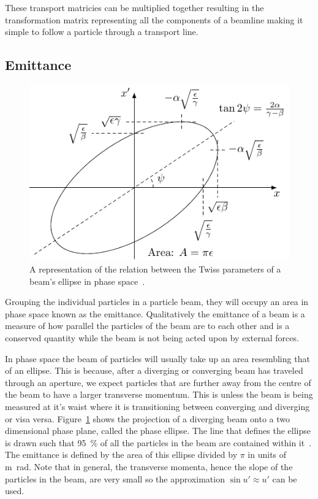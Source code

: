 These transport matricies can be multiplied together resulting in the
transformation matrix representing all the components of a beamline making it
simple to follow a particle through a transport line.

\subsection{Emittance}
\label{sec:emittance}

\begin{figure}
	\centering
	\includegraphics{figures/ellipse}
	\caption{
		A representation of the relation between the Twiss parameters of
		a beam's ellipse in phase space~\cite{wiedemann2007particle}.}
	\label{fig:ellipse}
\end{figure}

Grouping the individual particles in a particle beam, they will occupy an area
in phase space known as the emittance.  Qualitatively the emittance of a beam is
a measure of how parallel the particles of the beam are to each other and is a
conserved quantity while the beam is not being acted upon by external forces.

In phase space the beam of particles will usually take up an area resembling
that of an ellipse. This is because, after a diverging or converging beam has
traveled through an aperture, we expect particles that are further away from the
centre of the beam to have a larger transverse momentum. This is unless the beam
is being measured at it's waist where it is transitioning between converging and
diverging or visa versa. Figure~\ref{fig:ellipse} shows the projection of a
diverging beam onto a two dimensional phase plane, called the phase ellipse.
The line that defines the ellipse is drawn such that \SI{95}{\percent} of all
the particles in the beam are contained within it~\cite{buon1994beam}. The
emittance is defined by the area of this ellipse divided by \(\pi\) in units of
\si{\meter\radian}. Note that in general, the transverse momenta, hence the
slope of the particles in the beam, are very small so the approximation \(\sin
u'\approx u'\) can be used.

